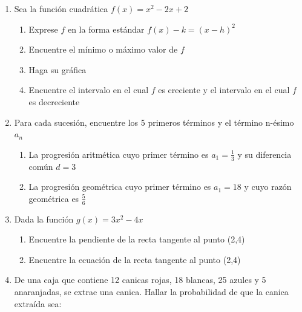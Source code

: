 \documentclass[letterpaper,fleqn]{article}
\begin{document}
\begin{enumerate}
\begin{enumerate}
\begin{enumerate}
\end{enumerate}
\end{enumerate}
\item Sea la función cuadrática $f(x)=x^{2}-2x+2$
\begin{enumerate}
\item Exprese $f$ en la forma estándar $f(x)-k=(x-h)^{2}$\noanswer
\item Encuentre el mínimo o máximo valor de $f$\noanswer[20pt]
\newpage
\item Haga su gráfica
\begin{center}
\end{center}
\item Encuentre el intervalo en el cual $f$ es creciente y el intervalo en el cual $f$ es decreciente \noanswer[15pt]
\end{enumerate}
\item Para cada sucesión, encuentre los 5 primeros términos y el término n-ésimo $a_{n}$
\begin{enumerate}
\item La progresión aritmética cuyo primer término es $a_{1}=\frac{1}{3}$ y su diferencia común $d=3$ \noanswer[45pt]
\item La progresión geométrica cuyo primer término es $a_{1}=18$ y cuyo razón geométrica es $\frac{5}{6}$ \noanswer[45pt]
\end{enumerate}
\item Dada la función $g(x)=3x^{2}-4x$ 
\begin{enumerate}
\item Encuentre la pendiente de la recta tangente al punto (2,4)\noanswer
\item Encuentre la ecuación de la recta tangente al punto (2,4)\noanswer
\end{enumerate}
\item De una caja que contiene 12 canicas rojas, 18 blancas, 25 azules y 5 anaranjadas, se extrae una canica. Hallar la probabilidad de que la canica extraída sea:
\begin{enumerate}
\end{enumerate}
 \end{enumerate}
\end{document}

